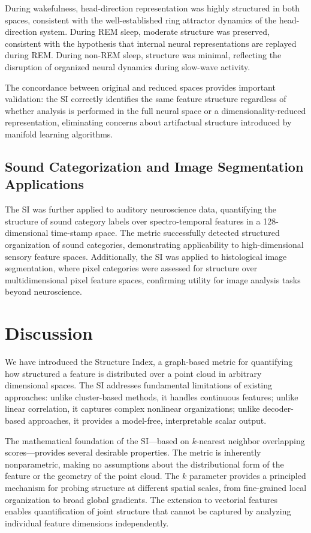 \documentclass[12pt]{article}
\begin{document}
During wakefulness, head-direction representation was highly structured in both spaces, consistent with the well-established ring attractor dynamics of the head-direction system. During REM sleep, moderate structure was preserved, consistent with the hypothesis that internal neural representations are replayed during REM. During non-REM sleep, structure was minimal, reflecting the disruption of organized neural dynamics during slow-wave activity.

The concordance between original and reduced spaces provides important validation: the SI correctly identifies the same feature structure regardless of whether analysis is performed in the full neural space or a dimensionality-reduced representation, eliminating concerns about artifactual structure introduced by manifold learning algorithms.

\subsection{Sound Categorization and Image Segmentation Applications}

The SI was further applied to auditory neuroscience data, quantifying the structure of sound category labels over spectro-temporal features in a 128-dimensional time-stamp space. The metric successfully detected structured organization of sound categories, demonstrating applicability to high-dimensional sensory feature spaces. Additionally, the SI was applied to histological image segmentation, where pixel categories were assessed for structure over multidimensional pixel feature spaces, confirming utility for image analysis tasks beyond neuroscience.

\section{Discussion}

We have introduced the Structure Index, a graph-based metric for quantifying how structured a feature is distributed over a point cloud in arbitrary dimensional spaces. The SI addresses fundamental limitations of existing approaches: unlike cluster-based methods, it handles continuous features; unlike linear correlation, it captures complex nonlinear organizations; unlike decoder-based approaches, it provides a model-free, interpretable scalar output.

The mathematical foundation of the SI---based on $k$-nearest neighbor overlapping scores---provides several desirable properties. The metric is inherently nonparametric, making no assumptions about the distributional form of the feature or the geometry of the point cloud. The $k$ parameter provides a principled mechanism for probing structure at different spatial scales, from fine-grained local organization to broad global gradients. The extension to vectorial features enables quantification of joint structure that cannot be captured by analyzing individual feature dimensions independently.
\end{document}
